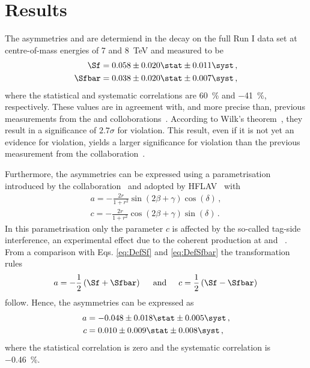 \chapter{Results}
\label{chap:results}

\linespread{1.08}\selectfont
The \CP asymmetries \Sf and \Sfbar are determiend in the \BdToDpi decay on the full \lhcb Run I data set at centre-of-mass energies of \num{7} and \SI{8}{\tera\electronvolt} and measured to be
\begin{equation}
\begin{aligned}
\Sf&=0.058\pm0.020\stat\pm0.011\syst\,,\\
\Sfbar&=0.038\pm0.020\stat\pm0.007\syst\,,
\end{aligned}
\end{equation}
where the statistical and systematic correlations are \SI{60}{\percent} and \SI{-41}{\percent}, respectively.
These values are in agreement with, and more precise than, previous measurements from the \belle and \babar colloborations~\cite{Ronga:2006hv,Aubert:2006tw}.
According to Wilk's theorem~\cite{wilks1938}, they result in a significance of $2.7\sigma$ for \mbox{\CP violation}.
This result, even if it is not yet an evidence for \CP violation, yields a larger significance for \CP violation than the previous measurement from the \belle collaboration~\cite{Ronga:2006hv}.

Furthermore, the \CP asymmetries can be expressed using a parametrisation introduced by the \babar collaboration~\cite{Aubert:2006tw} and adopted by HFLAV~\cite{HFLAV2016} with
\begin{equation}
\begin{aligned}
a=-\frac{2r}{1+r^2}\sin\!\left(2\beta+\gamma\right)\cos\!\left(\delta\right)\,,\\
c=-\frac{2r}{1+r^2}\cos\!\left(2\beta+\gamma\right)\sin\!\left(\delta\right)\,.
\end{aligned}
\end{equation}
In this parametrisation only the parameter $c$ is affected by the so-called tag-side interference, an experimental effect due to the coherent \Bz\Bzb production at \belle and \babar~\cite{Long:2003wq}.
From a comparison with Eqs. \eqref{eq:DefSf} and \eqref{eq:DefSfbar} the transformation rules
\begin{equation}
a=-\frac{1}{2}\left(\Sf+\Sfbar\right)\hspace{0.5cm}\text{and}\hspace{0.5cm}c=\frac{1}{2}\left(\Sf-\Sfbar\right)\\
\end{equation}
follow.
Hence, the \CP asymmetries can be expressed as
\begin{equation}
\begin{aligned}
a&=-0.048\pm0.018\stat\pm0.005\syst\,,\\
c&=0.010\pm0.009\stat\pm0.008\syst\,,\\
\end{aligned}
\end{equation}
where the statistical correlation is zero and the systematic correlation is \SI{-0.46}{\percent}.

